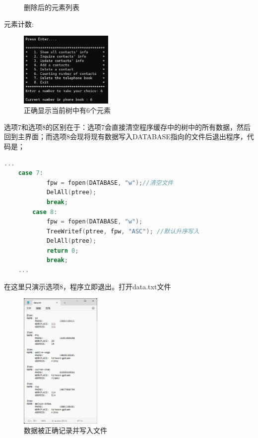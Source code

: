 \documentclass[12pt, a4paper, oneside]{ctexart}
\begin{document}
\begin{figure}[!h]
\begin{minipage}{0.49\linewidth}
            \caption{删除后的元素列表}
            \label{}
    \end{minipage}
    \end{figure}

元素计数:
\begin{figure}[ht]
  \centering
  \includegraphics[width=0.4\textwidth]{graphic/10.png}
  \caption{正确显示当前树中有6个元素}
  \label{}
\end{figure}

选项7和选项8的区别在于：选项7会直接清空程序缓存中的树中的所有数据，然后回到主界面；而选项8会现将现有数据写入DATABASE指向的文件后退出程序，代码是；

\begin{framed}
\begin{lstlisting}[language=C++]
    ...
    case 7:
            fpw = fopen(DATABASE, "w");//清空文件
            DelAll(ptree);
            break;
        case 8:
            fpw = fopen(DATABASE, "w");
            TreeWritef(ptree, fpw, "ASC"); //默认升序写入
            DelAll(ptree);
            return 0;
            break;
    ...
\end{lstlisting}
\end{framed}

在这里只演示选项8，程序立即退出。打开data.txt文件

\begin{figure}[ht]
  \centering
  \includegraphics[width=0.35\textwidth]{graphic/11.png}
  \caption{数据被正确记录并写入文件}
  \label{}
\end{figure}
\end{document}
